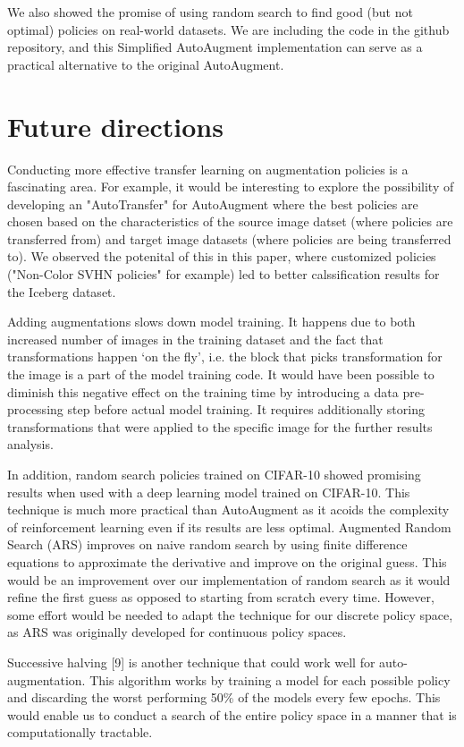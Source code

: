 \documentclass[10pt,twocolumn,letterpaper]{article}
\begin{document}
We also showed the promise of using random search to find good (but not optimal) policies on real-world datasets.  We are including the code in the github repository, and this Simplified AutoAugment implementation can serve as a practical alternative to the original AutoAugment.

\section{Future directions}

Conducting more effective transfer learning on augmentation policies is a fascinating area.  For example, it would be interesting to explore the possibility of developing an "AutoTransfer" for AutoAugment where the best policies are chosen based on the characteristics of the source image datset (where policies are transferred from) and target image datasets (where policies are being transferred to). We observed the potenital of this in this paper, where customized policies ("Non-Color SVHN policies" for example) led to better calssification results for the Iceberg dataset. 

Adding augmentations slows down model training. It happens due to both increased number of images in the training dataset and the fact that transformations happen ‘on the fly’, i.e. the block that picks transformation for the image is a part of the model training code. It would have been possible to diminish this negative effect on the training time by introducing a data pre-processing step before actual model training. It requires additionally storing transformations that were applied to the specific image for the further results analysis.

In addition, random search policies trained on CIFAR-10 showed promising results when used with a deep learning model trained on CIFAR-10. This technique is much more practical than AutoAugment as it acoids the complexity of reinforcement learning even if its results are less optimal. Augmented Random Search (ARS) improves on naive random search by using finite difference equations to approximate the derivative and improve on the original guess. This would be an improvement over our implementation of random search as it would refine the first guess as opposed to starting from scratch every time. However, some effort would be needed to adapt the technique for our discrete policy space, as ARS was originally developed for continuous policy spaces.

Successive halving [9] is another technique that could work well for auto-augmentation. This algorithm works by training a model for each possible policy and discarding the worst performing 50\% of the models every few epochs. This would enable us to conduct a search of the entire policy space in a manner that is computationally tractable.
\end{document}

